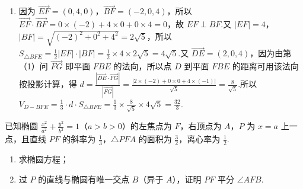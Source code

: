 \documentclass[UTF8,a4paper,oneside,11pt]{ctexbook}
\begin{document}
\begin{solution}
\begin{enumerate}
\item 因为 \(\overrightarrow{EF}=\left(0,4,0\right)\)，\(\overrightarrow{BF}=\left(-2,0,4\right)\)，所以 \(\overrightarrow{EF}\cdot\overrightarrow{BF}=0\times\left(-2\right)+4\times 0+0\times 4=0\)，故 \(EF\perp BF\).又 \(\left|EF\right|=4\)，\(\left|BF\right|=\sqrt{\left(-2\right)^2+0^2+4^2}=2\sqrt5\)，所以 \(S_{\triangle BFE}=\frac12\left|EF\right|\cdot\left|BF\right|=\frac12\times 4\times 2\sqrt5=4\sqrt5\).又 \(\overrightarrow{DE}=\left(2,0,4\right)\)，因为由第（1）问 \(\overrightarrow{FG}\) 即平面 \(FBE\) 的法向，所以点 \(D\) 到平面 \(FBE\) 的距离可用该法向按投影计算，得 \(d=\frac{\left|\overrightarrow{DE}\cdot\overrightarrow{FG}\right|}{\left|\overrightarrow{FG}\right|}=\frac{\left|2\times\left(-2\right)+0\times 0+4\times\left(-1\right)\right|}{\sqrt5}=\frac{8}{\sqrt5}\).所以 \(V_{D-BFE}=\frac13\cdot d\cdot S_{\triangle BFE}=\frac13\times\frac{8}{\sqrt5}\times 4\sqrt5=\frac{32}{3}\).
\end{enumerate}
\end{solution}

\begin{problem}
已知椭圆 \(\frac{x^2}{a^2}+\frac{y^2}{b^2}=1\)（\(a>b>0\)）的左焦点为 \(F\)，右顶点为 \(A\)，\(P\) 为 \(x=a\) 上一点，且直线 \(PF\) 的斜率为 \(\frac13\)，\(\triangle PFA\) 的面积为 \(\frac32\)，离心率为 \(\frac12\).
\begin{enumerate}
\item 求椭圆方程；
\item 过 \(P\) 的直线与椭圆有唯一交点 \(B\)（异于 \(A\)），证明 \(PF\) 平分 \(\angle AFB\).
\end{enumerate}

\end{problem}
\end{document}
